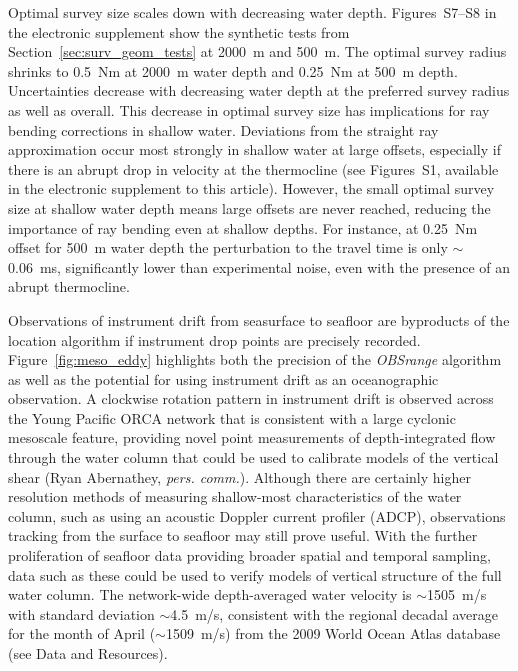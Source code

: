 Optimal survey size scales down with decreasing water depth. Figures~S7--S8 in the electronic supplement show the synthetic tests from Section~\ref{sec:surv_geom_tests} at 2000~m and 500~m. The optimal survey radius shrinks to 0.5~Nm at 2000~m water depth and 0.25~Nm at 500~m depth. Uncertainties decrease with decreasing water depth at the preferred survey radius as well as overall. This decrease in optimal survey size has implications for ray bending corrections in shallow water. Deviations from the straight ray approximation occur most strongly in shallow water at large offsets, especially if there is an abrupt drop in velocity at the thermocline (see Figures~S1, available in the electronic supplement to this article). However, the small optimal survey size at shallow water depth means large offsets are never reached, reducing the importance of ray bending even at shallow depths. For instance, at 0.25~Nm offset for 500~m water depth the perturbation to the travel time is only $\sim$0.06~ms, significantly lower than experimental noise, even with the presence of an abrupt thermocline.

Observations of instrument drift from seasurface to seafloor are byproducts of the location algorithm if instrument drop points are precisely recorded. Figure~\ref{fig:meso_eddy} highlights both the precision of the \textit{OBSrange} algorithm as well as the potential for using instrument drift as an oceanographic observation. A clockwise rotation pattern in instrument drift is observed across the Young Pacific ORCA network that is consistent with a large cyclonic mesoscale feature, providing novel point measurements of depth-integrated flow through the water column that could be used to calibrate models of the vertical shear (Ryan Abernathey, \textit{pers. comm.}). Although there are certainly higher resolution methods of measuring shallow-most characteristics of the water column, such as using an acoustic Doppler current profiler (ADCP), observations tracking from the surface to seafloor may still prove useful. With the further proliferation of seafloor data providing broader spatial and temporal sampling, data such as these could be used to verify models of vertical structure of the full water column. The network-wide depth-averaged water velocity is $\sim$1505~m/s with standard deviation $\sim$4.5~m/s, consistent with the regional decadal average for the month of April ($\sim$1509~m/s) from the 2009 World Ocean Atlas database (see Data and Resources).

